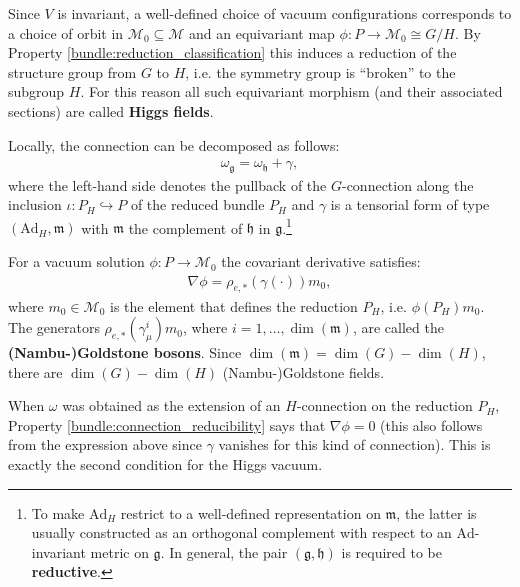     Since $V$ is invariant, a well-defined choice of vacuum configurations corresponds to a choice of orbit in $\mathcal{M}_0\subseteq\mathcal{M}$ and an equivariant map $\phi:P\rightarrow \mathcal{M}_0\cong G/H$. By Property \ref{bundle:reduction_classification} this induces a reduction of the structure group from $G$ to $H$, i.e. the symmetry group is ``broken'' to the subgroup $H$. For this reason all such equivariant morphism (and their associated sections) are called \textbf{Higgs fields}.

    Locally, the connection can be decomposed as follows:
    \begin{gather}
        \omega_\mathfrak{g} = \omega_\mathfrak{h} + \gamma,
    \end{gather}
    where the left-hand side denotes the pullback of the $G$-connection along the inclusion $\iota:P_H\hookrightarrow P$ of the reduced bundle $P_H$ and $\gamma$ is a tensorial form of type $(\mathrm{Ad}_H,\mathfrak{m})$ with $\mathfrak{m}$ the complement of $\mathfrak{h}$ in $\mathfrak{g}$.\footnote{To make $\mathrm{Ad}_H$ restrict to a well-defined representation on $\mathfrak{m}$, the latter is usually constructed as an orthogonal complement with respect to an $\mathrm{Ad}$-invariant metric on $\mathfrak{g}$. In general, the pair $(\mathfrak{g},\mathfrak{h})$ is required to be \textbf{reductive}.}

    For a vacuum solution $\phi:P\rightarrow\mathcal{M}_0$ the covariant derivative satisfies:
    \begin{gather}
        \nabla\phi = \rho_{e,\ast}(\gamma(\cdot))m_0,
    \end{gather}
    where $m_0\in\mathcal{M}_0$ is the element that defines the reduction $P_H$, i.e. $\phi(P_H) m_0$. The generators $\rho_{e,\ast}(\gamma^i_\mu)m_0$, where $i=1,\ldots,\dim(\mathfrak{m})$, are called the \textbf{(Nambu-)Goldstone bosons}. Since $\dim(\mathfrak{m})=\dim(G)-\dim(H)$, there are $\dim(G)-\dim(H)$ (Nambu-)Goldstone fields.

    When $\omega$ was obtained as the extension of an $H$-connection on the reduction $P_H$, Property \ref{bundle:connection_reducibility} says that $\nabla\phi=0$ (this also follows from the expression above since $\gamma$ vanishes for this kind of connection). This is exactly the second condition for the Higgs vacuum.